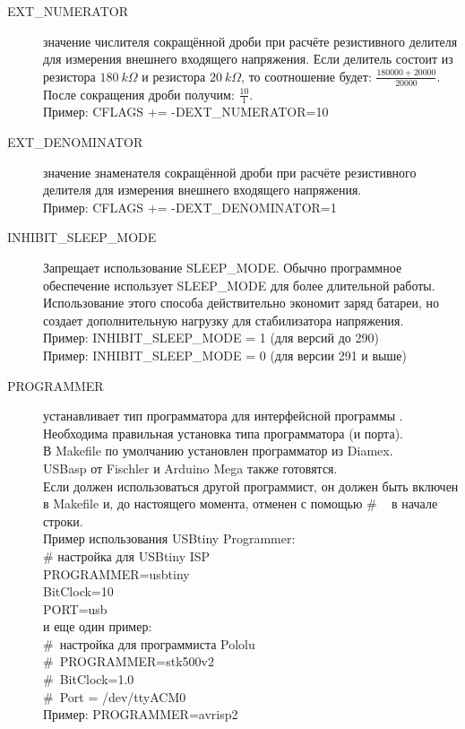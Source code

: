 \begin{description}
  \item[EXT\_NUMERATOR] значение числителя сокращённой дроби при расчёте резистивного делителя для измерения внешнего 
входящего напряжения.
Если делитель состоит из резистора \(180~k\Omega\) и резистора \(20~k\Omega\), то соотношение будет:
\(\frac{ 180000 + 20000}{ 20000}\).
После сокращения дроби получим: \(\frac{ 10}{ 1}\). \\
Пример: CFLAGS += -DEXT\_NUMERATOR=10

  \item[EXT\_DENOMINATOR] значение знаменателя сокращённой дроби при расчёте резистивного делителя для измерения 
внешнего входящего напряжения. \\
Пример: CFLAGS += -DEXT\_DENOMINATOR=1

  \item[INHIBIT\_SLEEP\_MODE] Запрещает использование SLEEP\_MODE. Обычно программное обеспечение 
использует SLEEP\_MODE для более длительной работы. Использование этого способа действительно экономит 
заряд батареи, но создает дополнительную нагрузку для стабилизатора напряжения.\\
Пример: INHIBIT\_SLEEP\_MODE = 1 (для версий до 290)\\
Пример: INHIBIT\_SLEEP\_MODE = 0 (для версии 291 и выше)
\label{sec:config-Prog}
  \item[PROGRAMMER] \label{PROGRAMMER}устанавливает тип программатора для интерфейсной программы .\\

Необходима правильная установка типа программатора (и порта). \\
В Makefile по умолчанию установлен программатор из Diamex. \\
USBasp от Fischler и Arduino Mega также готовятся. \\
Если должен использоваться другой программист, он должен быть включен в Makefile и, до настоящего момента, отменен с помощью \# ~ в начале строки. \\
Пример использования USBtiny Programmer: \\
\# настройка для USBtiny ISP\\
PROGRAMMER=usbtiny\\
BitClock=10\\
PORT=usb\\
и еще один пример:\\
\#~настройка для программиста Pololu\\
\#~PROGRAMMER=stk500v2\\
\#~BitClock=1.0\\
\#~Port = /dev/ttyACM0\\
Пример: PROGRAMMER=avrisp2



\end{description}
